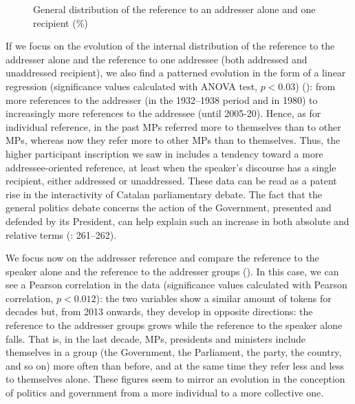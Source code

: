 \documentclass[output=paper]{langscibook}
\begin{document}
\begin{figure}
\caption{General distribution of the reference to an addresser alone and one recipient (\%)\label{fig:nogue:2}}
\end{figure}


If we focus on the evolution of the internal distribution of the reference to the addresser alone and the reference to one addressee (both addressed and unaddressed recipient), we also find a patterned evolution in the form of a linear regression (significance values calculated with ANOVA test, $p< 0.03$) (): from more references to the addresser (in the 1932–1938 period and in 1980) to increasingly more references to the addressee (until 2005-20). Hence, as for individual reference, in the past MPs referred more to themselves than to other MPs, whereas now they refer more to other MPs than to themselves. Thus, the higher participant inscription we saw in  includes a tendency toward a more addressee-oriented reference, at least when the speaker’s discourse has a single recipient, either addressed or unaddressed. These data can be read as a patent rise in the interactivity of Catalan parliamentary debate. The fact that the general politics debate concerns the action of the Government, presented and defended by its President, can help explain such an increase in both absolute and relative terms (\citealt{DeCock2014}: 261–262).\largerpage

We focus now on the addresser reference and compare the reference to the speaker alone and the reference to the addresser groups (). In this case, we can see a Pearson correlation in the data (significance values calculated with Pearson correlation, $p < 0.012$): the two variables show a similar amount of tokens for decades but, from 2013 onwards, they develop in opposite directions: the reference to the addresser groups grows while the reference to the speaker alone falls. That is, in the last decade, MPs, presidents and ministers include themselves in a group (the Government, the Parliament, the party, the country, and so on) more often than before, and at the same time they refer less and less to themselves alone. These figures seem to mirror an evolution in the conception of politics and government from a more individual to a more collective one.
\end{document}
